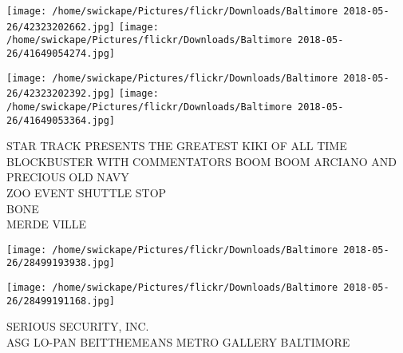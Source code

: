 \documentclass[10pt,letterpaper]{article}
\begin{document}
\texttt{[image: /home/swickape/Pictures/flickr/Downloads/Baltimore 2018-05-26/42323202662.jpg]}
\texttt{[image: /home/swickape/Pictures/flickr/Downloads/Baltimore 2018-05-26/41649054274.jpg]}

\texttt{[image: /home/swickape/Pictures/flickr/Downloads/Baltimore 2018-05-26/42323202392.jpg]}
\texttt{[image: /home/swickape/Pictures/flickr/Downloads/Baltimore 2018-05-26/41649053364.jpg]}

STAR TRACK PRESENTS THE GREATEST KIKI OF ALL TIME BLOCKBUSTER WITH COMMENTATORS BOOM BOOM ARCIANO AND PRECIOUS OLD NAVY\\
ZOO EVENT SHUTTLE STOP\\
BONE\\
MERDE VILLE\\
\pagebreak

\texttt{[image: /home/swickape/Pictures/flickr/Downloads/Baltimore 2018-05-26/28499193938.jpg]}

\vspace{0.25in}
\texttt{[image: /home/swickape/Pictures/flickr/Downloads/Baltimore 2018-05-26/28499191168.jpg]}

SERIOUS SECURITY, INC.\\
ASG LO{-}PAN BEITTHEMEANS METRO GALLERY BALTIMORE\\
\pagebreak
\end{document}
